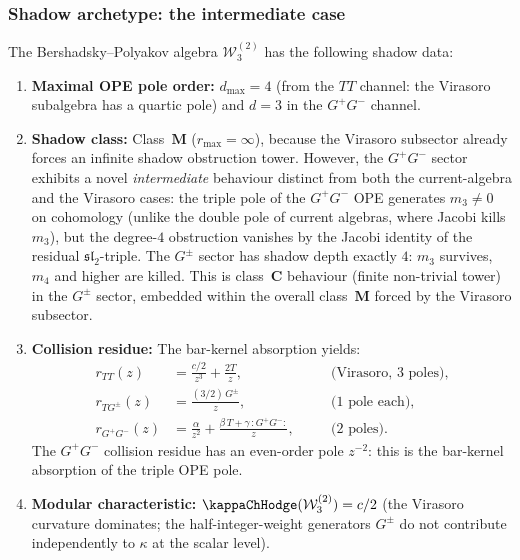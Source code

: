 \subsubsection{Shadow archetype: the intermediate case}

\begin{proposition}
\label{prop:BP-shadow}
The Bershadsky--Polyakov algebra $\mathcal{W}_3^{(2)}$ has the
following shadow data:
\begin{enumerate}[label=\textup{(\roman*)},nosep]
\item \textbf{Maximal OPE pole order:} $d_{\max} = 4$
 \textup{(}from the $TT$ channel: the Virasoro subalgebra has a
 quartic pole\textup{)} and $d = 3$ in the $G^+G^-$ channel.

\item \textbf{Shadow class:} Class~$\mathbf{M}$
 \textup{(}$r_{\max} = \infty$\textup{)}, because the Virasoro
 subsector already forces an infinite shadow obstruction tower. However,
 the $G^+G^-$ sector exhibits a novel \emph{intermediate} behaviour
 distinct from both the current-algebra and the Virasoro cases:
 the triple pole of the $G^+G^-$ OPE generates $m_3 \ne 0$ on
 cohomology \textup{(}unlike the double pole of current algebras,
 where Jacobi kills $m_3$\textup{)}, but the degree-$4$ obstruction
 vanishes by the Jacobi identity of the residual
 $\mathfrak{sl}_2$-triple. The $G^\pm$ sector has shadow depth
 exactly $4$: $m_3$ survives, $m_4$ and higher are killed.
 This is class~$\mathbf{C}$ behaviour \textup{(}finite non-trivial
 tower\textup{)} in the $G^\pm$ sector, embedded within
 the overall class~$\mathbf{M}$ forced by the Virasoro subsector.

\item \textbf{Collision residue:}
 The bar-kernel absorption yields:
 \begin{align*}
 r_{TT}(z) &= \frac{c/2}{z^3} + \frac{2T}{z},
 &\quad&\text{(Virasoro, 3 poles),} \\
 r_{TG^\pm}(z) &= \frac{(3/2)\,G^\pm}{z},
 &&\text{(1 pole each),} \\
 r_{G^+G^-}(z) &= \frac{\alpha}{z^2} + \frac{\beta\,T + \gamma\,{:}G^+G^-{:}}{z},
 &&\text{(2 poles).}
 \end{align*}
 The $G^+G^-$ collision residue has an even-order pole $z^{-2}$:
 this is the bar-kernel absorption of the triple OPE pole.

\item \textbf{Modular characteristic:}
 $\kappaChHodge(\mathcal{W}_3^{(2)}) = c/2$
 \textup{(}the Virasoro curvature dominates; the half-integer-weight
 generators $G^\pm$ do not contribute independently to $\kappa$
 at the scalar level\textup{)}.


\end{enumerate}
\end{proposition}
